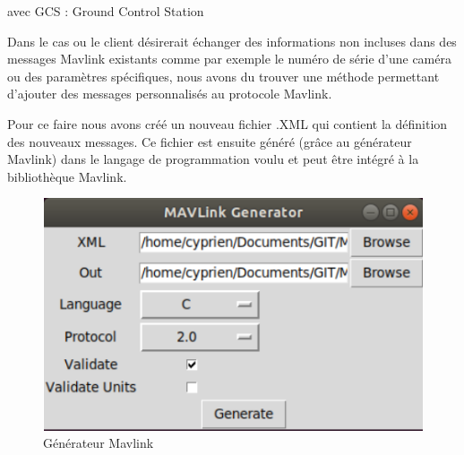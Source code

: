avec GCS : Ground  Control Station


Dans le cas ou le client désirerait échanger des informations non incluses dans des messages Mavlink existants comme par exemple le numéro de série d'une caméra ou des paramètres spécifiques, nous avons du trouver une méthode permettant d'ajouter des messages personnalisés au protocole Mavlink. 
\newline

Pour ce faire nous avons créé un nouveau fichier .XML qui contient la définition des nouveaux messages. Ce fichier est ensuite généré (grâce au générateur Mavlink) dans le langage de programmation voulu et peut être intégré à la bibliothèque Mavlink. 



\begin{figure}[ht]
    \centering
    \includegraphics[scale=0.6]{img/mavlink_gen.png}
    \caption{Générateur Mavlink}
    \label{fig:CameraCmdsettings}
\end{figure}
